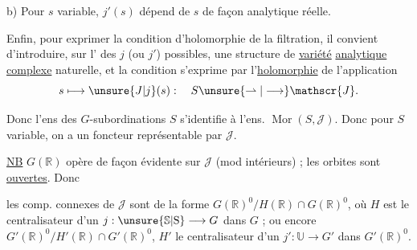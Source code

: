 b) Pour $s$ variable, $j'(s)$ dépend de $s$ de façon analytique réelle.

Enfin, pour exprimer la condition d'holomorphie de la filtration, il convient d'introduire,  sur l'  des $j$ (ou $j'$) possibles, une structure de \uline{variété} \uline{analytique} \uline{complexe} naturelle, et la condition s'exprime par l'\uline{holomorphie} de l'application
\[
s\longmapsto\unsure{J|j}(s):\quad S\unsure{\rightharpoonup|\longrightarrow}\mathscr{J}.
\]

 Donc l'ens des $G$-subordinations   $S$ s'identifie à l'ens. $\operatorname{Mor}(S,\mathscr{J})$. Donc pour $S$ variable, on a un foncteur représentable par $\mathscr{J}$.

\uline{NB} $G(\mathbb{R})$ opère de façon évidente sur $\mathscr{J}$ (mod  intérieurs) ; les orbites sont \uline{ouvertes}. Donc


les comp. connexes de $\mathscr{J}$ sont de la forme $G(\mathbb{R})^{0}/H(\mathbb{R})\cap G(\mathbb{R})^{0}$, où $H$ est le centralisateur d'un $j:\unsure{\mathbb{S}|\mathrm{S}}\longrightarrow G$ dans $G$ ; ou encore $G'(\mathbb{R})^{0}/H'(\mathbb{R})\cap G'(\mathbb{R})^{0}$, $H'$ le centralisateur d'un $j':\mathbb{U}\longrightarrow G'$ dans $G'(\mathbb{R})^{0}$.

